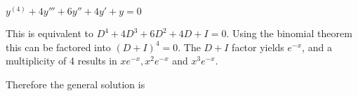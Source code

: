 $y^{(4)} + 4y''' + 6y'' + 4y' + y = 0$

\soln This is equivalent to $D^4 + 4D^3 + 6D^2 + 4D + I = 0$. Using the binomial theorem this can be factored into $(D+I)^4 = 0$. The $D+I$ factor yields $e^{-x}$, and a multiplicity of 4 results in $xe^{-x}, x^2e^{-x}$ and $x^3e^{-x}$.

\nl Therefore the general solution is 
